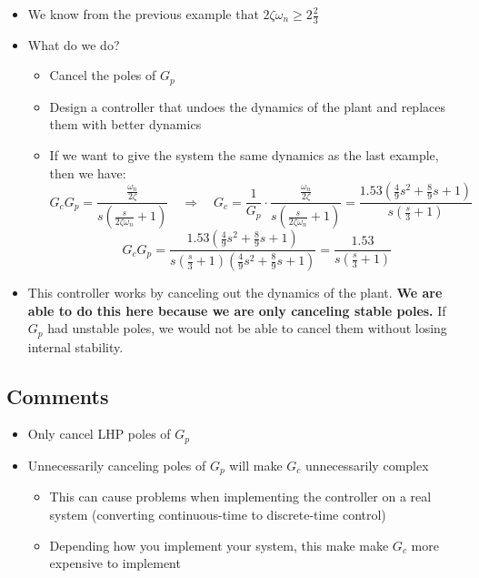 \documentclass{book}
\begin{document}
\begin{itemize}
	\item We know from the previous example that $ 2\zeta\omega_n \geq 2 \frac{2}{3} $
	\item What do we do?
	\begin{itemize}
		\item Cancel the poles of $ G_p $
		\item Design a controller that undoes the dynamics of the plant and replaces them with better dynamics
		\item If we want to give the system the same dynamics as the last example, then we have:
		\[ G_cG_p = \frac{\frac{\omega_n}{2\zeta}}{s\left(\frac{s}{2\zeta\omega_n}+1\right)} \quad\Rightarrow\quad G_c = \frac{1}{G_p}\cdot\frac{\frac{\omega_n}{2\zeta}}{s\left(\frac{s}{2\zeta\omega_n}+1\right)} = \frac{1.53 \left(\frac{4}{9}s^2+\frac{8}{9}s+1\right) }{s(\frac{s}{3}+1)} \]
		\[ G_cG_p = \frac{1.53 \left(\frac{4}{9}s^2+\frac{8}{9}s+1\right) }{s(\frac{s}{3}+1)\left(\frac{4}{9}s^2+\frac{8}{9}s+1\right)} = \frac{1.53}{s(\frac{s}{3}+1)} \]
	\end{itemize}
	\item This controller works by canceling out the dynamics of the plant. \textbf{We are able to do this here because we are only canceling stable poles.} If $ G_p $ had unstable poles, we would not be able to cancel them without losing internal stability.
\end{itemize}

\subsection*{Comments}
\begin{itemize}
	\item Only cancel LHP poles of $ G_p $
	\item Unnecessarily canceling poles of $ G_p $ will make $ G_c $ unnecessarily complex
	\begin{itemize}
		\item This can cause problems when implementing the controller on a real system (converting continuous-time to discrete-time control)
		\item Depending how you implement your system, this make make $ G_c $ more expensive to implement
	\end{itemize}
\end{itemize}
\end{document}
